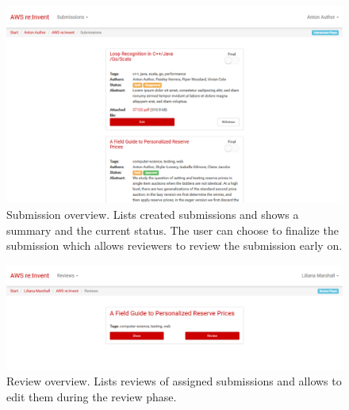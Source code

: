 \documentclass[nochapterpage,nopartpage,noheadingspace,numbersubsubsec,bigchapter,colorback,accentcolor=tud9c,10pt]{tudreport}
\begin{document}
        \begin{figure}[!ht]
            \centering
            \includegraphics[width=\textwidth]{img/ui-submission-overview}
            \caption{Submission overview. Lists created submissions and shows a summary and the current status. The user can choose to finalize the submission which allows reviewers to review the submission early on.}
            \label{fig:appendix:screenshots:ui-submission-overview}
        \end{figure}

        \begin{figure}[!ht]
            \centering
            \includegraphics[width=\textwidth]{img/ui-review-overview}
            \caption{Review overview. Lists reviews of assigned submissions and allows to edit them during the review phase.}
            \label{fig:appendix:screenshots:ui-review-overview}
        \end{figure}
\end{document}
